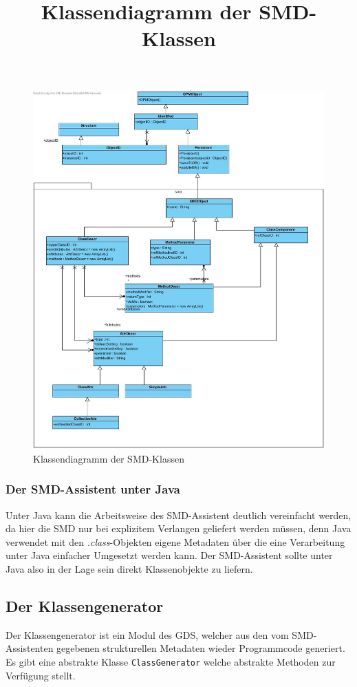 \begin{figure}[!ht]
\centering
\includegraphics[width=13cm]{Bilder/SMD_Klassen}
\title{Klassendiagramm der SMD-Klassen}
\caption{Klassendiagramm der SMD-Klassen}
\centering
\end{figure}

\subsubsection{Der SMD-Assistent unter Java}
Unter Java kann die Arbeitsweise des SMD-Assistent deutlich vereinfacht werden, da hier die \ac{SMD} nur bei explizitem Verlangen geliefert werden m\"ussen, denn Java verwendet mit den \textit{.class}-Objekten eigene Metadaten \"uber die eine Verarbeitung unter Java einfacher Umgesetzt werden kann. 
Der SMD-Assistent sollte unter Java also in der Lage sein direkt Klassenobjekte zu liefern.

\subsection{Der Klassengenerator} \label{CG}
Der Klassengenerator ist ein Modul des \ac{GDS}, welcher aus den vom SMD-Assistenten gegebenen strukturellen Metadaten wieder Programmcode generiert. Es gibt eine abstrakte Klasse \texttt{ClassGenerator} welche abstrakte Methoden zur Verf\"ugung stellt. 

